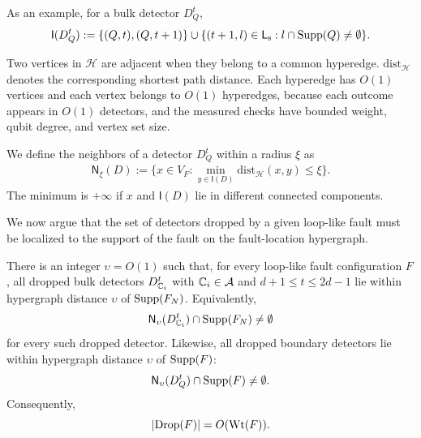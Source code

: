 \documentclass[11pt]{article}
\begin{document}
As an example, for a bulk detector $D_Q^t$,
\[
\mathsf{I}(D_Q^t):=\{ (Q,t), (Q,t+1)\}\cup \{(t+1,l)\in \mathsf{L}_\mathrm{s}:l\cap \operatorname{Supp}(Q)\neq \emptyset\}.
\]

Two vertices in $\mathcal{H}$ are adjacent when they belong to a common hyperedge. $\mathrm{dist}_\mathcal{H}$ denotes the corresponding shortest path distance.
Each hyperedge has $O(1)$ vertices and each vertex belongs to $O(1)$ hyperedges, because each outcome appears in $O(1)$ detectors, and the measured checks have bounded weight, qubit degree, and vertex set size. 

We define the neighbors of a detector $D_Q^t$ within a radius $\xi$ as
\begin{align}
\label{eq:detector-neighborhood}
    \mathsf{N}_\xi (D) := \{ x\in V_F: \min_{y\in \mathsf{I}(D)}\mathrm{dist}_{\mathcal{H}}(x,y)\le \xi\}.
\end{align}
The minimum is $+\infty$ if $x$ and $\mathsf{I}(D)$ lie in different connected components.

We now argue that the set of detectors dropped by a given loop-like fault must be localized to the support of the fault on the fault-location hypergraph.

\begin{lemma} \label{lem:dropped-detector-localization}
There is an integer $\upsilon=O(1)$ such that, for every loop-like fault configuration $F$, all dropped bulk detectors $D_{\mathbb{C}_{i}}^t$ with $\mathbb{C}_{i}\in \mathcal{A}$ and $d+1\leq t\leq 2d-1$ lie within hypergraph distance $\upsilon$ of $\operatorname{Supp}(F_N)$.
Equivalently,
\[
\mathsf{N}_{\upsilon}(D_{\mathbb{C}_{i}}^t)\cap \operatorname{Supp}(F_N)\neq \emptyset
\]
for every such dropped detector.
Likewise, all dropped boundary detectors lie within hypergraph distance $\upsilon$ of $\operatorname{Supp}(F)$:
\[
\mathsf{N}_\upsilon(D_Q^t)\cap \operatorname{Supp}(F)\neq \emptyset.
\]
Consequently,
\[
|\mathrm{Drop}(F)|=O(\operatorname{Wt}(F)).
\]
\end{lemma}
\end{document}
